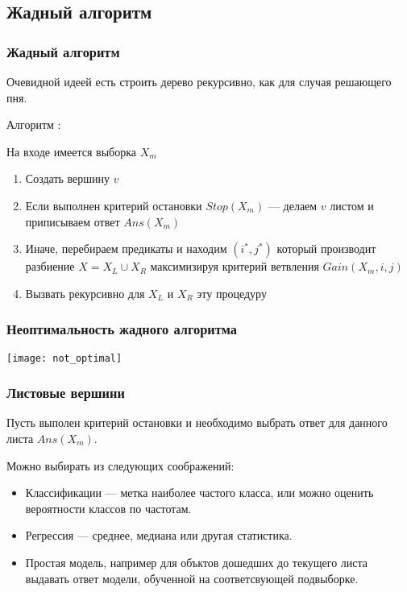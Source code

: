 \documentclass{beamer}
\begin{document}
	\subsection{Жадный алгоритм}

	\begin{frame}
		\frametitle{Жадный алгоритм}

		Очевидной идеей есть строить дерево рекурсивно, как для случая решающего пня.

		\vspace{15pt}

		Алгоритм :

		На входе имеется выборка $X_m$
		\begin{enumerate}
			\item Создать вершину $v$
			\item Если выполнен критерий остановки $Stop(X_m)$ --- делаем $v$ листом и приписываем ответ $Ans(X_m)$
			\item Иначе, перебираем предикаты и находим $(i^*, j^*)$ который производит разбиение $X = X_L \cup X_R$ максимизируя
			критерий ветвления $Gain(X_m, i, j)$
			\item Вызвать рекурсивно для $X_L$ и $X_R$ эту процедуру
		\end{enumerate}
	\end{frame}

	\begin{frame}
		\frametitle{Неоптимальность жадного алгоритма}

		\texttt{[image: not\_optimal]}
	\end{frame}
	
	\begin{frame}
		\frametitle{Листовые вершини}

		Пусть выполен критерий остановки и необходимо выбрать ответ для данного листа $Ans(X_m)$.

		\vspace{15pt}

		Можно выбирать из следующих соображений:
		\begin{itemize}
			\item Классификации --- метка наиболее частого класса, или можно оценить вероятности классов по
			частотам.
			\item Регрессия --- среднее, медиана или другая статистика.
			\item Простая модель, например для объктов дошедших до текущего листа выдавать ответ модели, обученной на
			соответсвующей подвыборке.
		\end{itemize}
	\end{frame}
\end{document}
